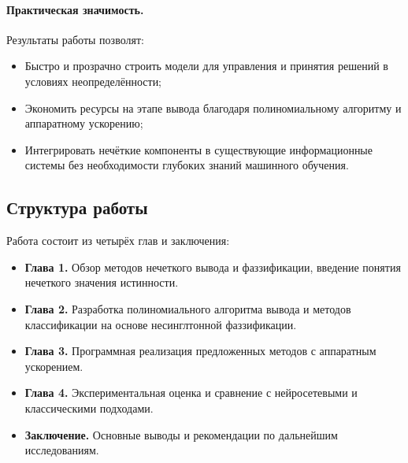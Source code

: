 \paragraph{Практическая значимость.} 
Результаты работы позволят:
\begin{itemize}
  \item Быстро и прозрачно строить модели для управления и принятия решений в условиях неопределённости;
  \item Экономить ресурсы на этапе вывода благодаря полиномиальному алгоритму и аппаратному ускорению;
  \item Интегрировать нечёткие компоненты в существующие информационные системы без необходимости глубоких знаний машинного обучения.
\end{itemize}

\subsection{Структура работы}

Работа состоит из четырёх глав и заключения:
\begin{itemize}
  \item \textbf{Глава 1.} Обзор методов нечеткого вывода и фаззификации, введение понятия нечеткого значения истинности.
  \item \textbf{Глава 2.} Разработка полиномиального алгоритма вывода и методов классификации на основе несинглтонной фаззификации.
  \item \textbf{Глава 3.} Программная реализация предложенных методов с аппаратным ускорением.
  \item \textbf{Глава 4.} Экспериментальная оценка и сравнение с нейросетевыми и классическими подходами.
  \item \textbf{Заключение.} Основные выводы и рекомендации по дальнейшим исследованиям.
\end{itemize}
